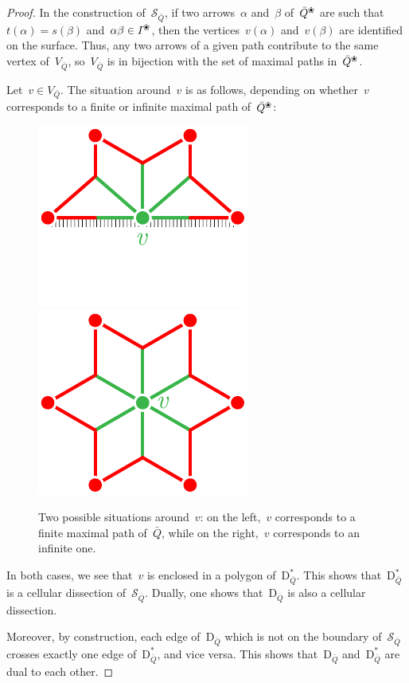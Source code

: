 \documentclass{amsart}
\theoremstyle{definition}
\newcommand{\blossom}{^\text{\ding{96}}} %
\newcommand{\surface}{\mathcal{S}} %
\newcommand{\dual}{^*} %
\newcommand{\dissection}{\mathrm{D}} %
\begin{document}
\begin{proof}
In the construction of~$\surface_{\bar Q}$, if two arrows~$\alpha$ and~$\beta$ of~$\bar Q \blossom$ are such that~${t(\alpha) = s(\beta)}$ and~${\alpha\beta \in I\blossom}$, then the vertices~$v(\alpha)$ and~$v(\beta)$ are identified on the surface.
Thus, any two arrows of a given path contribute to the same vertex of~$V_{\bar Q}$, so~$V_{\bar Q}$ is in bijection with the set of maximal paths in~$\bar Q\blossom$.

Let~$v\in V_{\bar Q}$. The situation around~$v$ is as follows, depending on whether~$v$ corresponds to a finite or infinite maximal path of~$\bar Q\blossom$:

\begin{figure}[h]
	\capstart
	\centerline{\includegraphics[scale=.7]{halfStar} \qquad \includegraphics[scale=.7]{star}}
	\caption{Two possible situations around~$v$: on the left,~$v$ corresponds to a finite maximal path of~$\bar Q$, while on the right,~$v$ corresponds to an infinite one.}
	\label{fig:stars}
\end{figure}

In both cases, we see that~$v$ is enclosed in a polygon of~$\dissection_{\bar Q}\dual$.  This shows that~$\dissection_{\bar Q}\dual$ is a cellular dissection of~$\surface_{\bar Q}$.
Dually, one shows that~$\dissection_{\bar Q}$ is also a cellular dissection.

Moreover, by construction, each edge of~$\dissection_{\bar Q}$ which is not on the boundary of~$\surface_{\bar Q}$ crosses exactly one edge of~$\dissection_{\bar Q}\dual$, and vice versa.
This shows that~$\dissection_{\bar Q}$ and~$\dissection_{\bar Q}\dual$ are dual to each other.
\end{proof}
\end{document}
